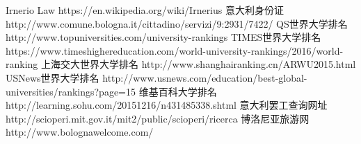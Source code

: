 \begin{thebibliography}{90}             %
\rhead[\fancyplain{}{\bfseries \leftmark}]{\fancyplain{}{\bfseries
\thepage}}
Irnerio Law https://en.wikipedia.org/wiki/Irnerius
意大利身份证 http://www.comune.bologna.it/cittadino/servizi/9:2931/7422/
QS世界大学排名 http://www.topuniversities.com/university-rankings
TIMES世界大学排名 https://www.timeshighereducation.com/world-university-rankings/2016/world-ranking
上海交大世界大学排名 http://www.shanghairanking.cn/ARWU2015.html
USNews世界大学排名 http://www.usnews.com/education/best-global-universities/rankings?page=15
维基百科大学排名 http://learning.sohu.com/20151216/n431485338.shtml
意大利罢工查询网址 http://scioperi.mit.gov.it/mit2/public/scioperi/ricerca
博洛尼亚旅游网 http://www.bolognawelcome.com/
\end{thebibliography}

